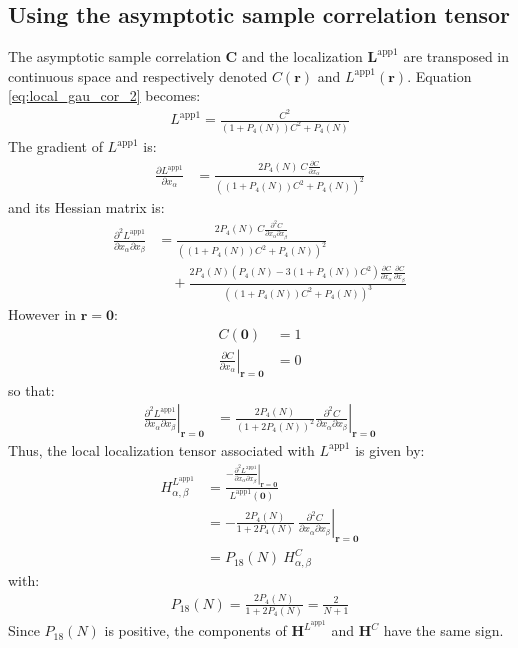 \documentclass[12pt]{scrartcl}
\begin{document}
\subsection{Using the asymptotic sample correlation tensor}
The asymptotic sample correlation $\mathbf{C}$ and the localization $\mathbf{L}^\mathrm{app1}$ are transposed in continuous space and respectively denoted $C(\mathbf{r})$ and $L^\mathrm{app1}(\mathbf{r})$. Equation \eqref{eq:local_gau_cor_2} becomes:
\begin{align}
L^\mathrm{app1} = \frac{C^2}{\left(1 + P_4(N)\right) C^2 + P_4(N)}
\end{align}
The gradient of $L^\mathrm{app1}$ is:
\begin{align}
\frac{\partial L^\mathrm{app1}}{\partial x_\alpha} & = \frac{\displaystyle 2 P_4(N) \ C \frac{\partial C}{\partial x_\alpha}}{\left(\left(1 + P_4(N)\right) C^2 + P_4(N)\right)^2}
\end{align}
and its Hessian matrix is:
\begin{align}
\frac{\partial^2 L^\mathrm{app1}}{\partial x_\alpha \partial x_\beta} & = \frac{\displaystyle 2 P_4(N) \ C \frac{\partial^2 C}{\partial x_\alpha \partial x_\beta}}{\left(\left(1 + P_4(N)\right) C^2 + P_4(N)\right)^2} \nonumber \\
& \quad + \frac{\displaystyle 2 P_4(N) \left(P_4(N) - 3 \left(1 + P_4(N)\right) C^2\right) \frac{\partial C}{\partial x_\alpha} \frac{\partial C}{\partial x_\beta}}{\left(\left(1 + P_4(N)\right) C^2 + P_4(N)\right)^3}
\end{align}
However in $\mathbf{r} = \mathbf{0}$:
\begin{subequations}
\begin{align}
C(\mathbf{0}) & = 1 \\
\left.\frac{\partial C}{\partial x_\alpha}\right|_{\mathbf{r}=\mathbf{0}} & = 0
\end{align}
\end{subequations}
so that:
\begin{align}
\left.\frac{\partial^2 L^\mathrm{app1}}{\partial x_\alpha \partial x_\beta}\right|_{\mathbf{r}=\mathbf{0}} & = \frac{2 P_4(N)}{\left(1 + 2 P_4(N)\right)^2} \left.\frac{\partial^2 C}{\partial x_\alpha \partial x_\beta}\right|_{\mathbf{r}=\mathbf{0}}
\end{align}
Thus, the local localization tensor associated with $L^\mathrm{app1}$ is given by:
\begin{align}
H^{L^\mathrm{app1}}_{\alpha,\beta} & = \frac{\displaystyle - \left.\frac{\partial^2 L^\mathrm{app1}}{\partial x_\alpha \partial x_\beta}\right|_{\mathbf{r}=\mathbf{0}}}{L^\mathrm{app1}(\mathbf{0})} \nonumber \\
& = - \frac{2 P_4(N)}{1 + 2 P_4(N)} \ \left.\frac{\partial^2 C}{\partial x_\alpha \partial x_\beta}\right|_{\mathbf{r}=\mathbf{0}} \nonumber \\
& = P_{18}(N) \ H^{C}_{\alpha,\beta}
\end{align}
with:
\begin{align}
P_{18}(N) = \frac{2 P_4(N)}{1 + 2 P_4(N)} = \frac{2}{N+1}
\end{align}
Since $P_{18}(N)$ is positive, the components of $\mathbf{H}^{L^\mathrm{app1}}$ and $\mathbf{H}^{C}$ have the same sign.
\end{document}
